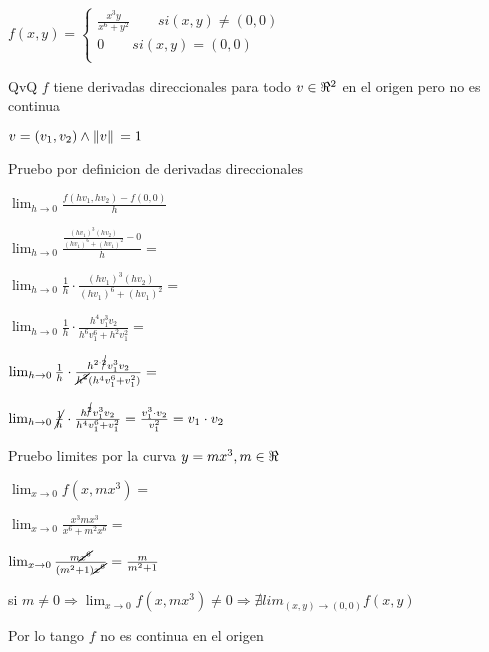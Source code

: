 \documentclass[../practica_04.tex]{subfiles}
\begin{document}
    $ f(x,y) = \left\{
    \begin{array}{ll}
        \frac{x^3y}{x^6+y^2} \qquad si (x,y) \neq (0,0)\\
        0 \qquad si (x,y) = (0,0)\\
    \end{array}
    \right.$

    QvQ $f$ tiene derivadas direccionales para todo $v \in \real^2$ en el origen pero no es continua

    $v = (v_1,v_2) \wedge \norm*{v} = 1 $

    Pruebo por definicion de derivadas direccionales

    $\lim_{h \to 0} \frac{f(hv_1,hv_2) - f(0,0)}{h} $

    $\lim_{h \to 0} \frac{\frac{(hv_1)^3(hv_2)}{(hv_1)^6+(hv_1)^2} - 0}{h} = $

    $\lim_{h \to 0} \frac{1}{h} \cdot \frac{(hv_1)^3(hv_2)}{(hv_1)^6+(hv_1)^2} = $

    $\lim_{h \to 0} \frac{1}{h} \cdot \frac{h^4v_1^3v_2}{h^6v_1^6+h^2v_1^2} = $

    $\lim_{h \to 0} \frac{1}{h} \cdot \frac{h^{2\cdot\cancel{2}}v_1^3v_2}{\cancel{h^2}(h^4v_1^6+v_1^2)} = $

    $\lim_{h \to 0} \cancel{\frac{1}{h}} \cdot \frac{h^{\cancel{2}}v_1^3v_2}{h^4v_1^6+v_1^2} = \frac{v_1^3\cdot v_2}{v_1^2} = v_1\cdot v_2  $

    Pruebo limites por la curva $ y = mx^3, m \in \real$

    $\lim_{x \to 0} f(x,mx^3) = $

    $\lim_{x \to 0} \frac{x^3mx^3}{x^6+m^2x^6} = $

    $\lim_{x \to 0} \frac{m\cancel{x^6}}{(m^2+1)\cancel{x^6}} = \frac{m}{m^2+1} $

    si $m \neq 0 \Rightarrow \lim_{x \to 0} f(x,mx^3) \neq 0 \Rightarrow \nexists lim_{(x,y)\to(0,0)} f(x,y)$ 

    Por lo tango $f$ no es continua en el origen
\end{document}
